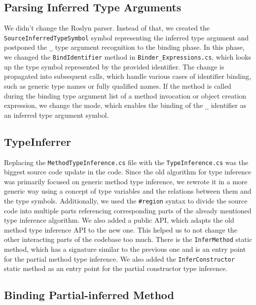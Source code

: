\subsection{Parsing Inferred Type Arguments}

We didn’t change the Roslyn parser. 
Instead of that, we created the\\ \texttt{SourceInferredTypeSymbol} symbol representing the inferred type argument and postponed the \texttt{\_} type argument recognition to the binding phase. 
In this phase, we changed the \texttt{BindIdentifier} method in \texttt{Binder\_Expressions.cs}, which looks up the type symbol represented by the provided identifier. 
The change is propagated into subsequent calls, which handle various cases of identifier binding, such as generic type names or fully qualified names. 
If the method is called during the binding type argument list of a method invocation or object creation expression, we change the mode, which enables the binding of the \texttt{\_} identifier as an inferred type argument symbol.

\subsection{TypeInferrer}

Replacing the \texttt{MethodTypeInference.cs} file with the \texttt{TypeInference.cs} was the biggest source code update in the code. 
Since the old algorithm for type inference was primarily focused on generic method type inference, we rewrote it in a more generic way using a concept of type variables and the relations between them and the type symbols. 
Additionally, we used the \texttt{\#region} syntax to divide the source code into multiple parts referencing corresponding parts of the already mentioned type inference algorithm. 
We also added a public API, which adapts the old method type inference API to the new one. 
This helped us to not change the other interacting parts of the codebase too much. 
There is the \texttt{InferMethod} static method, which has a signature similar to the previous one and is an entry point for the partial method type inference. 
We also added the \texttt{InferConstructor} static method as an entry point for the partial constructor type inference.

\subsection{Binding Partial-inferred Method}

